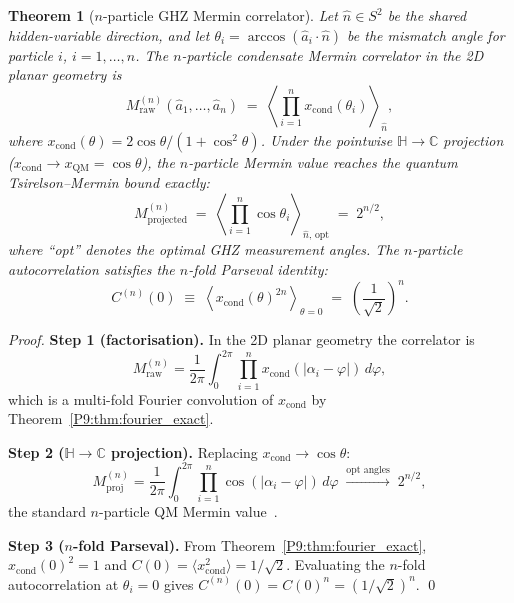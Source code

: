 \documentclass[11pt,a4paper]{article}
\newtheorem{theorem}{Theorem}[section]
\theoremstyle{definition}
\theoremstyle{remark}
\newcommand{\CC}{\mathbb{C}}
\newcommand{\HH}{\mathbb{H}}
\newcommand{\xcond}{x_{\mathrm{cond}}}
\begin{document}
\begin{theorem}[$n$-particle GHZ Mermin correlator]
\label{P9:thm:GHZ}
Let $\hat{n}\in S^2$ be the shared hidden-variable direction, and let
$\theta_i = \arccos(\hat{a}_i\cdot\hat{n})$ be the mismatch angle for
particle $i$, $i=1,\ldots,n$.
The $n$-particle condensate Mermin correlator in the 2D planar geometry is
\begin{equation}
  M_\mathrm{raw}^{(n)}(\hat{a}_1,\ldots,\hat{a}_n)
  \;=\; \left\langle\prod_{i=1}^n \xcond(\theta_i)\right\rangle_{\!\hat{n}},
  \label{P9:eq:Mermin_raw}
\end{equation}
where $\xcond(\theta) = 2\cos\theta/(1+\cos^2\theta)$.
Under the pointwise $\HH\to\CC$ projection ($\xcond\to x_\mathrm{QM}=\cos\theta$),
the $n$-particle Mermin value reaches the quantum Tsirelson--Mermin
bound exactly:
\begin{equation}
  M_\mathrm{projected}^{(n)}
  \;=\; \left\langle\prod_{i=1}^n \cos\theta_i\right\rangle_{\!\hat{n},\,\mathrm{opt}}
  \;=\; 2^{n/2},
  \label{P9:eq:Mermin_QM}
\end{equation}
where ``opt'' denotes the optimal GHZ measurement angles.
The $n$-particle autocorrelation satisfies the \emph{$n$-fold Parseval identity}:
\begin{equation}
  \boxed{C^{(n)}(0)
  \;\equiv\; \left\langle\xcond(\theta)^{2n}\right\rangle_{\!\theta=0}
  \;=\; \left(\frac{1}{\sqrt{2}}\right)^n}.
  \label{P9:eq:parseval_n}
\end{equation}
\end{theorem}
 
\begin{proof}
\textbf{Step 1 (factorisation).}
In the 2D planar geometry the correlator is
\begin{equation*}
  M^{(n)}_\mathrm{raw}
  = \frac{1}{2\pi}\int_0^{2\pi}\prod_{i=1}^n\xcond(|\alpha_i-\varphi|)\,d\varphi,
\end{equation*}
which is a multi-fold Fourier convolution of $\xcond$ by Theorem~\ref{P9:thm:fourier_exact}.
 
\textbf{Step 2 ($\HH\to\CC$ projection).}
Replacing $\xcond\to\cos\theta$:
\begin{equation*}
  M^{(n)}_\mathrm{proj}
  = \frac{1}{2\pi}\int_0^{2\pi}\prod_{i=1}^n\cos(|\alpha_i-\varphi|)\,d\varphi
  \;\xrightarrow{\text{opt angles}}\; 2^{n/2},
\end{equation*}
the standard $n$-particle QM Mermin value~\cite{Mermin1990}.
 
\textbf{Step 3 ($n$-fold Parseval).}
From Theorem~\ref{P9:thm:fourier_exact}, $\xcond(0)^2 = 1$ and
$C(0) = \langle\xcond^2\rangle = 1/\sqrt{2}$.
Evaluating the $n$-fold autocorrelation at $\theta_i=0$ gives
$C^{(n)}(0) = C(0)^n = (1/\sqrt{2})^n$.
\qed
\end{proof}
 
\end{document}
